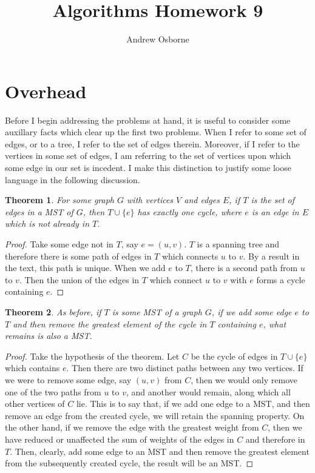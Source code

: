 \documentclass{article}
\author{Andrew Osborne}
\title{Algorithms Homework 9}
\newtheorem{thm}{Theorem}
\begin{document}
  \maketitle
  \section*{Overhead}
    Before I begin addressing the problems at hand, it is useful 
    to consider some auxillary facts which clear up the first two problems.
    When I refer to some set of edges, or to a tree, I refer to the set of 
    edges therein. 
    Moreover, if I refer to the vertices in some set of edges, I am referring
    to the set of vertices upon which some edge in our set is incedent.
    I make this distinction to justify some loose language in the following
    discussion.

    \begin{thm} For some graph $G$ with vertices $V$ and edges $E$,
    if $T$ is the set of edges in a MST of $G$, then $T\cup\{e\}$ has 
    exactly one cycle, where $e$ is an edge in $E$ which is not already in $T$.
    \end{thm}

    \begin{proof}
      Take some edge not in $T$, say $e = (u,v)$.
      $T$ is a spanning tree and therefore there is some path of edges
      in $T$ which connects $u$ to $v$. 
      By a result in the text, this path is unique.
      When we add $e$ to $T$, there is a second path from $u$ to $v$.
      Then the union of the edges in $T$ which connect $u$ to $v$ with
      $e$ forms a cycle containing $e$.
    \end{proof}

    \begin{thm}
      As before, if $T$ is some MST of a graph $G$, if we add some edge
      $e$ to $T$ and then remove the greatest element of the cycle in $T$ 
      containing $e$, what remains is also a MST.
    \end{thm}
    \begin{proof}
      Take the hypothesis of the theorem.
      Let $C$ be the cycle of edges in $T \cup \{e\}$ which contains
      $e$.
      Then there are two distinct paths 
      between any two vertices. 
      If we were to remove some edge, say $(u,v)$ from $C$, then we would only remove 
      one of the two paths from $u$ to $v$, and another would remain, along which
      all other vertices of $C$ lie. 
      This is to say that, if we add one edge to a MST, and then remove an edge from
      the created cycle, we will retain the spanning property.
      On the other hand, if we remove the edge with the greatest weight from $C$, then we have reduced or unaffected the sum of weights of the edges in $C$ and therefore
      in $T$. 
      Then, clearly, add some edge to an MST and then remove the greatest element 
      from the subsequently created cycle, the result will be an MST.

    \end{proof}
\end{document}
